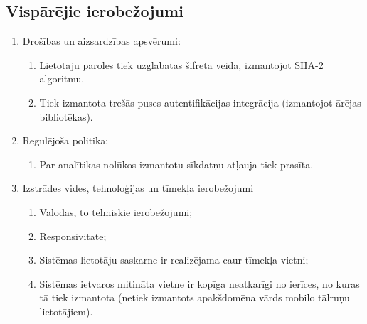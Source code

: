 \subsection{Vispārējie ierobežojumi}
\begin{enumerate}
	\item Drošības un aizsardzības apsvērumi:
	      \begin{enumerate}
		      \item Lietotāju paroles tiek uzglabātas šifrētā veidā, izmantojot SHA-2 algoritmu.
		      \item Tiek izmantota trešās puses autentifikācijas integrācija (izmantojot ārējas bibliotēkas).
	      \end{enumerate}
	\item Regulējoša politika:
	      \begin{enumerate}
		      \item Par analītikas nolūkos izmantotu sīkdatņu atļauja tiek prasīta.
	      \end{enumerate}
	\item Izstrādes vides, tehnoloģijas un tīmekļa ierobežojumi
	      \begin{enumerate}
		      \item Valodas, to tehniskie ierobežojumi;
		      \item Responsivitāte;
		      \item Sistēmas lietotāju saskarne ir realizējama caur tīmekļa vietni;
		      \item Sistēmas ietvaros mitināta vietne ir kopīga neatkarīgi no ierīces, no kuras tā tiek izmantota (netiek izmantots apakšdomēna vārds mobilo tālruņu lietotājiem).
	      \end{enumerate}
\end{enumerate}
